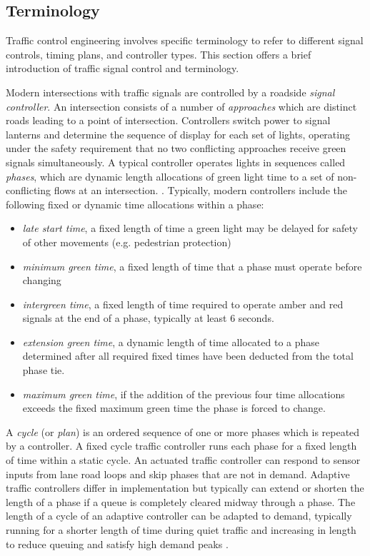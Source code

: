 \begin{appendices}

\chapter{Terminology}
\label{appendix:terminology}

Traffic control engineering involves specific terminology to refer to different signal controls, timing plans, and controller types. This section offers a brief introduction of traffic signal control and terminology.

Modern intersections with traffic signals are controlled by a roadside \emph{signal controller}. An intersection consists of a number of \emph{approaches} which are distinct roads leading to a point of intersection. Controllers switch power to signal lanterns and determine the sequence of display for each set of lights, operating under the safety requirement that no two conflicting approaches receive green signals simultaneously. A typical controller operates lights in sequences called \emph{phases}, which are dynamic length allocations of green light time to a set of non-conflicting flows at an intersection. \cite{papa2003review}. Typically, modern controllers include the following fixed or dynamic time allocations within a phase:

\begin{itemize}
\item \emph{late start time}, a fixed length of time a green light may be delayed for safety of other movements (e.g. pedestrian protection)
\item \emph{minimum green time}, a fixed length of time that a phase must operate before changing
\item \emph{intergreen time}, a fixed length of time required to operate amber and red signals at the end of a phase, typically at least 6 seconds. 
\item \emph{extension green time}, a dynamic length of time allocated to a phase determined after all required fixed times have been deducted from the total phase tie. 
\item \emph{maximum green time}, if the addition of the previous four time allocations exceeds the fixed maximum green time the phase is forced to change. 
\end{itemize}

A \emph{cycle} (or \emph{plan}) is an ordered sequence of one or more phases which is repeated by a controller. A fixed cycle traffic controller runs each phase for a fixed length of time within a static cycle. An actuated traffic controller can respond to sensor inputs from lane road loops and skip phases that are not in demand. Adaptive traffic controllers differ in implementation but typically can extend or shorten the length of a phase if a queue is completely cleared midway through a phase. The length of a cycle of an adaptive controller can be adapted to demand, typically running for a shorter length of time during quiet traffic and increasing in length to reduce queuing and satisfy high demand peaks \cite{scatstraining}.


\end{appendices}
